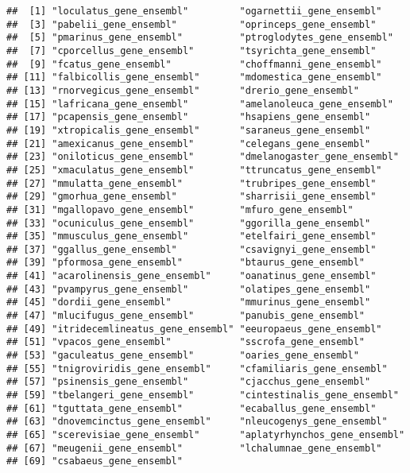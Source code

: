 \documentclass{article}\usepackage[]{graphicx}\usepackage[]{color}
\makeatletter
\newenvironment{kframe}{%
 \def\at@end@of@kframe{}%
 \ifinner\ifhmode%
  \def\at@end@of@kframe{\end{minipage}}%
  \begin{minipage}{\columnwidth}%
 \fi\fi%
 \def\FrameCommand##1{\hskip\@totalleftmargin \hskip-\fboxsep
 \colorbox{shadecolor}{##1}\hskip-\fboxsep
     \hskip-\linewidth \hskip-\@totalleftmargin \hskip\columnwidth}%
 \MakeFramed {\advance\hsize-\width
   \@totalleftmargin\z@ \linewidth\hsize
   \@setminipage}}%
 {\par\unskip\endMakeFramed%
 \at@end@of@kframe}
\newenvironment{knitrout}{}{} %
\makeatother
\begin{document}
\begin{knitrout}
\color{fgcolor}\begin{kframe}
\begin{verbatim}
##  [1] "loculatus_gene_ensembl"         "ogarnettii_gene_ensembl"       
##  [3] "pabelii_gene_ensembl"           "oprinceps_gene_ensembl"        
##  [5] "pmarinus_gene_ensembl"          "ptroglodytes_gene_ensembl"     
##  [7] "cporcellus_gene_ensembl"        "tsyrichta_gene_ensembl"        
##  [9] "fcatus_gene_ensembl"            "choffmanni_gene_ensembl"       
## [11] "falbicollis_gene_ensembl"       "mdomestica_gene_ensembl"       
## [13] "rnorvegicus_gene_ensembl"       "drerio_gene_ensembl"           
## [15] "lafricana_gene_ensembl"         "amelanoleuca_gene_ensembl"     
## [17] "pcapensis_gene_ensembl"         "hsapiens_gene_ensembl"         
## [19] "xtropicalis_gene_ensembl"       "saraneus_gene_ensembl"         
## [21] "amexicanus_gene_ensembl"        "celegans_gene_ensembl"         
## [23] "oniloticus_gene_ensembl"        "dmelanogaster_gene_ensembl"    
## [25] "xmaculatus_gene_ensembl"        "ttruncatus_gene_ensembl"       
## [27] "mmulatta_gene_ensembl"          "trubripes_gene_ensembl"        
## [29] "gmorhua_gene_ensembl"           "sharrisii_gene_ensembl"        
## [31] "mgallopavo_gene_ensembl"        "mfuro_gene_ensembl"            
## [33] "ocuniculus_gene_ensembl"        "ggorilla_gene_ensembl"         
## [35] "mmusculus_gene_ensembl"         "etelfairi_gene_ensembl"        
## [37] "ggallus_gene_ensembl"           "csavignyi_gene_ensembl"        
## [39] "pformosa_gene_ensembl"          "btaurus_gene_ensembl"          
## [41] "acarolinensis_gene_ensembl"     "oanatinus_gene_ensembl"        
## [43] "pvampyrus_gene_ensembl"         "olatipes_gene_ensembl"         
## [45] "dordii_gene_ensembl"            "mmurinus_gene_ensembl"         
## [47] "mlucifugus_gene_ensembl"        "panubis_gene_ensembl"          
## [49] "itridecemlineatus_gene_ensembl" "eeuropaeus_gene_ensembl"       
## [51] "vpacos_gene_ensembl"            "sscrofa_gene_ensembl"          
## [53] "gaculeatus_gene_ensembl"        "oaries_gene_ensembl"           
## [55] "tnigroviridis_gene_ensembl"     "cfamiliaris_gene_ensembl"      
## [57] "psinensis_gene_ensembl"         "cjacchus_gene_ensembl"         
## [59] "tbelangeri_gene_ensembl"        "cintestinalis_gene_ensembl"    
## [61] "tguttata_gene_ensembl"          "ecaballus_gene_ensembl"        
## [63] "dnovemcinctus_gene_ensembl"     "nleucogenys_gene_ensembl"      
## [65] "scerevisiae_gene_ensembl"       "aplatyrhynchos_gene_ensembl"   
## [67] "meugenii_gene_ensembl"          "lchalumnae_gene_ensembl"       
## [69] "csabaeus_gene_ensembl"
\end{verbatim}



\end{kframe}
\end{knitrout}
\end{document}
